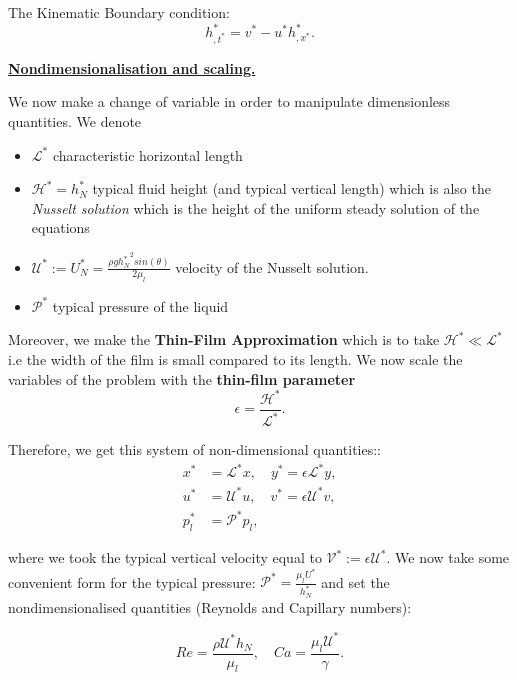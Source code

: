 \documentclass[12pt]{article}
\begin{document}
The Kinematic Boundary condition: 
\begin{equation}
h^*_{,t^*} = v^*-u^*h^*_{,x^*}.
\end{equation}


\vspace{0.5cm}
\underline{\textbf{Nondimensionalisation and scaling.}}


We now make a change of variable in order to manipulate dimensionless quantities. We denote 
\begin{itemize}
    \item $\mathcal{L^*}$ characteristic horizontal length
    \item $\mathcal{H^*}= h_N^* $ typical fluid height (and typical vertical length) which is also the \textit{Nusselt solution} which is the height of the uniform steady solution of the equations 
    \item $\mathcal{U^*} := U^*_N=\frac{\rho g{h_N^*}^2 sin(\theta)}{2\mu_l}$  velocity of the Nusselt solution. 
    \item $\mathcal{P^*}$ typical pressure of the liquid \\
\end{itemize}


Moreover, we make the \textbf{Thin-Film Approximation} which is to take $\mathcal{H^*} \ll \mathcal{L^*}$ i.e the width of the film is small compared to its length. We now scale the variables of the problem with the \textbf{thin-film parameter} 
\begin{equation}
\boxed{
\epsilon = \frac{\mathcal{H^*}}{\mathcal{L^*}}.
}
\end{equation}

Therefore, we get this system of non-dimensional quantities:: 
\begin{align*}
    x^* &= \mathcal{L^*}x, \quad y^*= \epsilon \mathcal{L^*}y, \\
    u^* &= \mathcal{U^*}u,  \quad v^*= \epsilon \mathcal{U^*}v, \\
    p_l^* &= \mathcal{P^*}p_l,
\end{align*}

where we took the typical vertical velocity equal to $\mathcal{V}^*:=\epsilon\mathcal{U}^*.$ We now take some convenient form for the typical pressure: $\mathcal{P^*} = \frac{\mu_lU^*}{h_N^*}$ and set the nondimensionalised quantities (Reynolds and Capillary numbers): 

\begin{equation}
    \boxed{
    Re = \frac{\rho \mathcal{U^*} h_N}{\mu_l}, \quad Ca = \frac{\mu_l \mathcal{U^*}}{\gamma}.
    }
\end{equation}
\\
\end{document}
